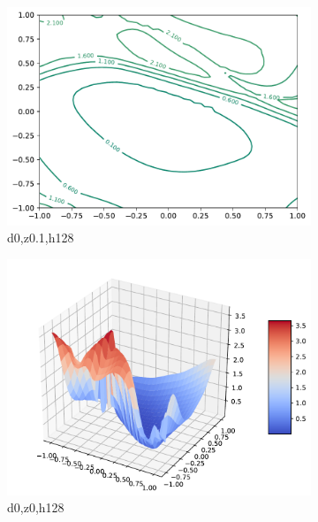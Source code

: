 \documentclass{article}
\begin{document}
\begin{figure}
\begin{subfigure}[b]{0.3\textwidth}
		\includegraphics[width=\textwidth]{report_images/d0_z0.1_h128_2D.pdf}
		\caption{d0,z0.1,h128}
    \end{subfigure}
    \begin{subfigure}[b]{0.3\textwidth}
        \centering
		\includegraphics[width=\textwidth]{report_images/d0_z0_h128_3D_1.pdf}
		\caption{d0,z0,h128}
    \end{subfigure}
    \begin{subfigure}[b]{0.3\textwidth}
        \centering

\end{subfigure}
\end{figure}
\end{document}
